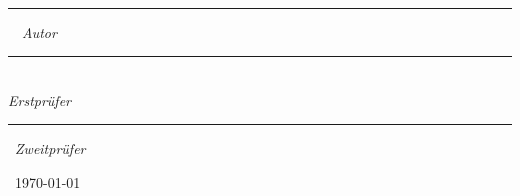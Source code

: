\begin{titlepage}
    \centering
    {\scshape\LARGE \uni \par \studiengang \par \modul \par}
    \vspace{1cm}
    {\scshape\Large \titel \par}
    \vspace{1.5cm}
    {\bfseries \huge \subtitel \par}
    \vspace{2cm}
    {\itshape \Large \vorname\ \nachname\par \matr \par}
    \vfill
    \begin{center}
        \uklogo
        \par
        \abteilung

    \end{center}
    \par\vfill
    \parbox{3cm}{\centering	\hrule \strut \centering \footnotesize {\vorname\ \nachname}\ \textit{Autor}}
    \hfill
    \parbox{5cm}{\hrule \strut \centering \footnotesize \erstpruefer\ \\ \textit{Erstprüfer}}
    \hfill
    \parbox{4cm}{\hrule \strut \centering \footnotesize \zweitpruefer\ \textit{Zweitprüfer}}
    \vfill
    {\large\location\ \today\par}
\end{titlepage}